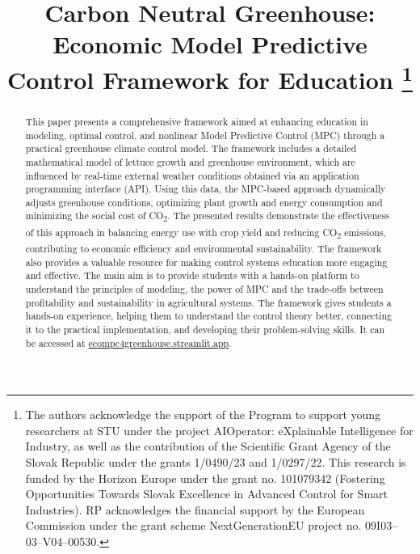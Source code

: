 \documentclass[conference]{IEEEtran}
\begin{document}
\title{\vspace*{18pt}Carbon Neutral Greenhouse: Economic Model Predictive Control Framework for Education
    \thanks{The authors acknowledge the support of the Program to support young researchers at STU under the project AIOperator: eXplainable Intelligence for Industry, as well as the contribution of the Scientific Grant Agency of the Slovak Republic under the grants 1/0490/23 and 1/0297/22. This research is funded by the Horizon Europe under the grant no. 101079342 (Fostering Opportunities Towards Slovak Excellence in Advanced Control for Smart Industries). RP acknowledges the financial support by the European Commission under the grant scheme NextGenerationEU project no. 09I03--03--V04--00530.}
}

\author{
}

\maketitle

\begin{abstract}
    This paper presents a comprehensive framework aimed at enhancing education in modeling, optimal control, and nonlinear Model Predictive Control (MPC) through a practical greenhouse climate control model. The framework includes a detailed mathematical model of lettuce growth and greenhouse environment, which are influenced by real-time external weather conditions obtained via an application programming interface (API). Using this data, the MPC-based approach dynamically adjusts greenhouse conditions, optimizing plant growth and energy consumption and minimizing the social cost of CO\textsubscript{2}. The presented results demonstrate the effectiveness of this approach in balancing energy use with crop yield and reducing CO\textsubscript{2} emissions, contributing to economic efficiency and environmental sustainability.
    The framework also provides a valuable resource for making control systems education more engaging and effective. The main aim is to provide students with a hands-on platform to understand the principles of modeling, the power of MPC and the trade-offs between profitability and sustainability in agricultural systems. The framework gives students a hands-on experience, helping them to understand the control theory better, connecting it to the practical implementation, and developing their problem-solving skills. It can be accessed at \url{ecompc4greenhouse.streamlit.app}.
\end{abstract}
\end{document}
